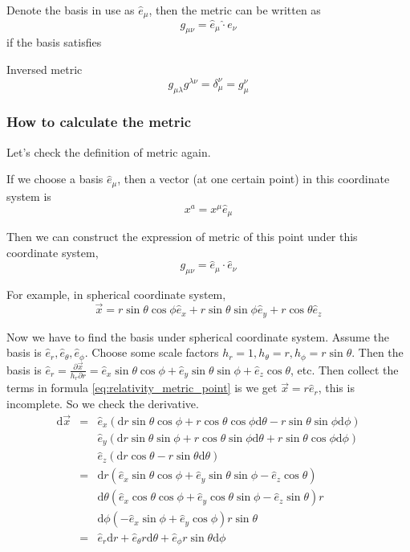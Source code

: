 \documentclass[11pt]{book}
\begin{document}
Denote the basis in use as $\hat e_\mu$, then the metric can be written as
\begin{equation}
g_{\mu\nu}=\hat e_\mu \hat \cdot e_\nu
\end{equation}
if the basis satisfies

Inversed metric
\begin{equation}
g_{\mu\lambda}g^{\lambda\nu}=\delta_\mu^\nu = g_\mu^\nu
\end{equation}





\subsubsection{How to calculate the metric}

Let's check the definition of metric again.

If we choose a basis $\hat e_\mu$, then a vector (at one certain point) in this coordinate system is
\begin{equation}
x^a=x^\mu \hat e_\mu
\end{equation}

Then we can construct the expression of metric of this point under this coordinate system,
\begin{equation}
g_{\mu\nu}=\hat e_\mu\cdot \hat e_\nu
\end{equation}

For example, in spherical coordinate system, 
\begin{equation}
\vec x=r\sin \theta\cos\phi \hat e_x+r\sin\theta\sin\phi \hat e_y+r\cos\theta \hat e_z \label{eq:relativity_metric_point}
\end{equation}



Now we have to find the basis under spherical coordinate system. Assume the basis is $\hat e_r, \hat e_\theta, \hat e_\phi$. Choose some scale factors $h_r=1, h_\theta=r, h_\phi=r\sin\theta$. Then the basis is
$\hat e_r=\frac{\partial \vec x}{h_r\partial r}=\hat e_x \sin\theta\cos\phi+\hat e_y \sin\theta\sin\phi+\hat e_z \cos\theta$, etc. Then collect the terms in formula \ref{eq:relativity_metric_point} is we get $\vec x=r\hat e_r$, this is incomplete. So we check the derivative.
\begin{eqnarray}
\mathrm d\vec x&=& \hat e_x (\mathrm dr \sin\theta\cos\phi+r\cos\theta\cos\phi\mathrm d\theta-r\sin\theta\sin\phi\mathrm d\phi)\\
&&\hat e_y (\mathrm dr\sin\theta\sin\phi+r\cos\theta\sin\phi\mathrm d\theta+r\sin\theta\cos\phi\mathrm d\phi) \\
&&\hat e_z (\mathrm dr\cos\theta-r\sin\theta\mathrm d\theta) \\
&=&\mathrm dr(\hat e_x\sin\theta\cos\phi +\hat e_y \sin\theta\sin\phi -\hat e_z \cos\theta)  \\
&&\mathrm d\theta (\hat e_x\cos\theta\cos\phi +\hat e_y \cos\theta\sin\phi - \hat e_z \sin\theta)r \\
&&\mathrm d\phi (-\hat e_x\sin\phi +\hat e_y \cos\phi)r\sin\theta  \\
&=&\hat e_r\mathrm dr+\hat e_\theta r\mathrm d\theta +\hat e_\phi r\sin\theta\mathrm d \phi
\end{eqnarray}
\end{document}
